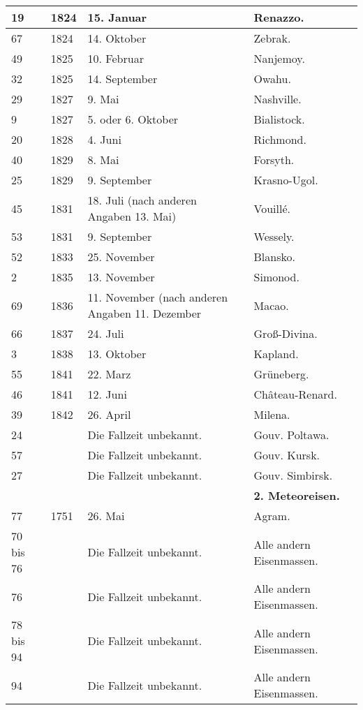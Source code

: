 \documentclass[a4paper, 11pt, oneside, polutonikogreek, german]{article}
\begin{document}
\begin{center}
\begin{longtable}{|p{6mm}|p{9mm}|p{60mm}|p{27mm}|}
        19 & 1824 & 15. Januar & Renazzo. \\ \hline
        67 & 1824 & 14. Oktober & Zebrak. \\ \hline
        49 & 1825 & 10. Februar & Nanjemoy. \\ \hline
        32 & 1825 & 14. September & Owahu. \\ \hline
        29 & 1827 & 9. Mai & Nashville. \\ \hline
        9 & 1827 & 5. oder 6. Oktober & Bialistock. \\ \hline
        20 & 1828 & 4. Juni & Richmond. \\ \hline
        40 & 1829 & 8. Mai & Forsyth. \\ \hline
        25 & 1829 & 9. September & Krasno-Ugol. \\ \hline
        45 & 1831 & 18. Juli (nach anderen Angaben 13. Mai) & Vouillé. \\ \hline
        53 & 1831 & 9. September & Wessely. \\ \hline
        52 & 1833 & 25. November & Blansko. \\ \hline
        2 & 1835 & 13. November & Simonod. \\ \hline
        69 & 1836 & 11. November (nach anderen Angaben 11. Dezember & Macao. \\ \hline
        66 & 1837 & 24. Juli & Groß-Divina. \\ \hline
        3 & 1838 & 13. Oktober & Kapland. \\ \hline
        55 & 1841 & 22. Marz & Grüneberg. \\ \hline
        46 & 1841 & 12. Juni & Château-Renard. \\ \hline
        39 & 1842 & 26. April & Milena. \\ \hline
        24 & ~ & Die Fallzeit unbekannt. & Gouv. Poltawa. \\ \hline
        57 & ~ & Die Fallzeit unbekannt. & Gouv. Kursk. \\ \hline
        27 & ~ & Die Fallzeit unbekannt. & Gouv. Simbirsk. \\ \hline
        ~ & ~ & ~ & \textbf{2. Meteoreisen.} \\ \hline
        77 & 1751 & 26. Mai & Agram. \\ \hline
        70 bis 76 & ~ & Die Fallzeit unbekannt. & Alle andern Eisenmassen. \\ \hline
        76 & ~ & Die Fallzeit unbekannt. & Alle andern Eisenmassen. \\ \hline
        78 bis 94 & ~ & Die Fallzeit unbekannt. & Alle andern Eisenmassen. \\ \hline
        94 & ~ & Die Fallzeit unbekannt. & Alle andern Eisenmassen. \\ \hline
    \end{longtable}
\end{center}
\clearpage
\end{document}
